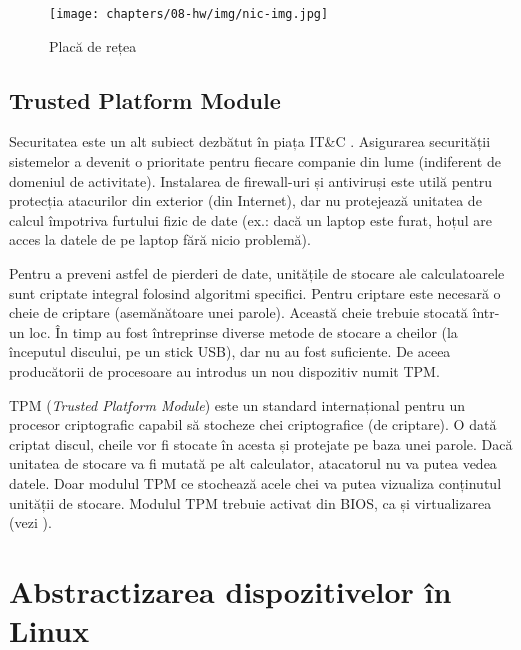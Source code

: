 \begin{figure}[!htbp]
  \centering
  \texttt{[image: chapters/08-hw/img/nic-img.jpg]}
  \caption{Placă de rețea\protect\footnotemark}
  \label{fig:hw:nic}
\end{figure}

\subsection{Trusted Platform Module}
\label{sec:hw:features:tpm}

Securitatea este un alt subiect dezbătut în piața IT\&C
. Asigurarea
securității sistemelor a devenit o prioritate pentru fiecare companie din lume
(indiferent de domeniul de activitate). Instalarea de firewall-uri și antiviruși
este utilă pentru protecția atacurilor din exterior (din Internet), dar nu
protejează unitatea de calcul împotriva furtului fizic de date (ex.: dacă un
laptop este furat, hoțul are acces la datele de pe laptop fără nicio problemă).

Pentru a preveni astfel de pierderi de date, unitățile de stocare ale
calculatoarele sunt criptate integral folosind algoritmi specifici. Pentru
criptare este necesară o cheie de criptare (asemănătoare unei parole). Această
cheie trebuie stocată într-un loc. În timp au fost întreprinse diverse metode de
stocare a cheilor (la începutul discului, pe un stick USB), dar nu au fost
suficiente. De aceea producătorii de procesoare au introdus un nou dispozitiv
numit TPM.

TPM (\textit{Trusted Platform Module}) este un standard internațional
pentru un procesor criptografic capabil să stocheze chei criptografice (de
criptare). O dată criptat discul, cheile vor fi stocate în acesta și protejate
pe baza unei parole. Dacă unitatea de stocare va fi mutată pe alt calculator,
atacatorul nu va putea vedea datele. Doar modulul TPM ce stochează acele chei va
putea vizualiza conținutul unității de stocare. Modulul TPM trebuie activat din
BIOS, ca și virtualizarea (vezi ).

\section{Abstractizarea dispozitivelor în Linux}
\label{sec:hw:abstraction}

